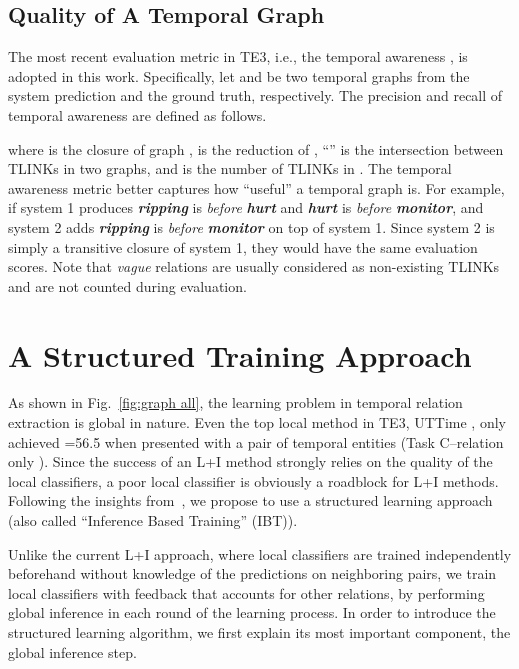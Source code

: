 \documentclass[11pt,letterpaper]{article}
\newcommand{\event}[1]{\textit{\textbf{#1}}}
\newcommand{\rel}[1]{\textit{#1}}
\newcommand{\ignore}[1]{}
\begin{document}
\subsection{Quality of A Temporal Graph}
\ignore{The straightforward evaluation metric for a predicted temporal graph is to count the number of correct TLINKs, and compute the precision and recall using it.}
The most recent evaluation metric in TE3, i.e., the temporal awareness \citep{uzzaman2011temporal}, is adopted in this work.
Specifically, let  and  be two temporal graphs from the system prediction and the ground truth, respectively. The precision and recall of temporal awareness are defined as follows.

where  is the closure of graph ,  is the reduction of , ``'' is the intersection between TLINKs in two graphs, and  is the number of TLINKs in .
The temporal awareness metric better captures how ``useful'' a temporal graph is. For example, if system 1 produces \event{ripping} is \rel{before} \event{hurt} and \event{hurt} is \rel{before} \event{monitor}, and system 2 adds \event{ripping} is \rel{before} \event{monitor} on top of system 1. Since system 2 is simply a transitive closure of system 1, they would have the same evaluation scores.
Note that \textit{vague} relations are usually considered as non-existing TLINKs and are not counted during evaluation. 	\section{A Structured Training Approach}
\label{sec:proposed}
As shown in Fig.~\ref{fig:graph all}, the learning problem in temporal relation extraction is global in nature. 
Even the top local method in TE3, UTTime \citep{laokulrat2013uttime}, only achieved =56.5 when presented with a pair of temporal entities (Task C--relation only \citep{uzzaman2013TE3}).
Since the success of an L+I method strongly relies on the quality of the local classifiers, a poor local classifier is obviously a roadblock for L+I methods.
Following the insights from~\citet{PRYZ05}, we propose to use a structured learning approach (also called ``Inference Based Training'' (IBT)).


Unlike the current L+I approach, where local classifiers are trained independently beforehand without knowledge of the predictions on neighboring pairs, we train local classifiers with feedback that accounts for other relations, by performing global inference in each round of the learning process. 
In order to introduce the structured learning algorithm, we first explain its most important component, the global inference step.
\end{document}
